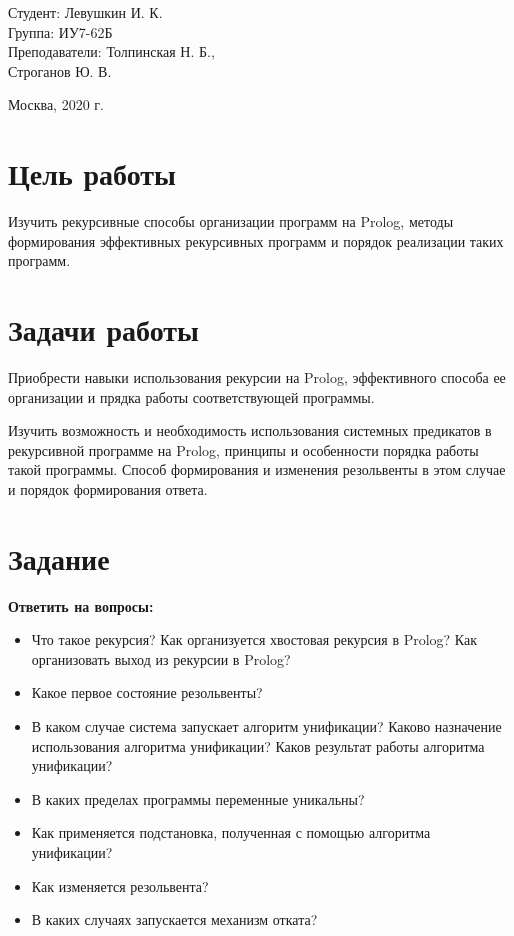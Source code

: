 \documentclass[a4paper,12pt]{article}
\begin{document}
	\vspace*{15mm} 	
	
	\large
	\begin{flushright}
		Студент: Левушкин И. К. \\
		Группа: ИУ7-62Б \\
		Преподаватели: Толпинская Н. Б., \\ Строганов Ю. В. \\
	\end{flushright}
	
	\vspace*{30mm}
	\begin{center}
		Москва, 2020 г.  
	\end{center}
	\thispagestyle{empty}
	
	
	\newpage
	
	\section*{Цель работы}
	
	Изучить рекурсивные способы организации программ на Prolog, методы формирования эффективных рекурсивных программ и порядок реализации таких программ.
	
	\section*{Задачи работы}
	
	Приобрести навыки использования рекурсии на Prolog, эффективного способа ее организации и прядка работы соответствующей программы.
	
	Изучить возможность и необходимость использования системных предикатов в рекурсивной программе на Prolog, принципы и особенности порядка работы такой программы. Способ формирования и изменения резольвенты в этом случае и порядок формирования ответа.
	
	
	\section*{Задание}
	
	{\bf Ответить на вопросы:}
	
	\begin{itemize}
		\item Что такое рекурсия? Как организуется хвостовая рекурсия в Prolog? Как организовать выход из рекурсии в Prolog?
		\item Какое первое состояние резольвенты?
		\item В каком случае система запускает алгоритм унификации? Каково назначение использования алгоритма унификации?  Каков результат работы алгоритма унификации? 
		\item В каких пределах программы переменные уникальны? 
		\item Как применяется подстановка, полученная с помощью алгоритма унификации?
		\item Как изменяется резольвента?
		\item В каких случаях запускается механизм отката?
	\end{itemize}
	
\end{document}

